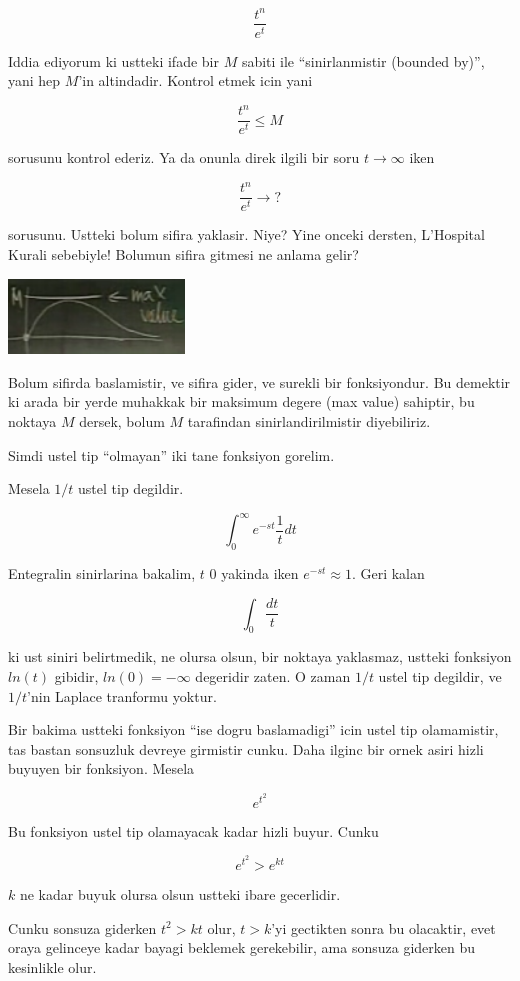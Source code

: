 \documentclass[12pt,fleqn]{article}
\begin{document}
\[ \frac{t^n}{e^t} \]

Iddia ediyorum ki ustteki ifade bir $M$ sabiti ile ``sinirlanmistir
(bounded by)'', yani hep $M$'in altindadir. Kontrol etmek icin yani

\[ \frac{t^n}{e^t} \le  M\]

sorusunu kontrol ederiz. Ya da onunla direk ilgili bir soru  $t \to \infty$ iken

\[ \frac{t^n}{e^t} \to ?\]

sorusunu. Ustteki bolum sifira yaklasir. Niye? Yine onceki dersten,
L'Hospital Kurali sebebiyle! Bolumun sifira gitmesi ne anlama gelir? 

\includegraphics[height=2cm]{20_1.png}

Bolum sifirda baslamistir, ve sifira gider, ve surekli bir fonksiyondur. Bu
demektir ki arada bir yerde muhakkak bir maksimum degere (max value)
sahiptir, bu noktaya $M$ dersek, bolum $M$ tarafindan sinirlandirilmistir
diyebiliriz.

Simdi ustel tip ``olmayan'' iki tane fonksiyon gorelim. 

Mesela $1/t$ ustel tip degildir. 

\[ \int_0^{\infty} e^{-st}\frac{1}{t} dt  \]

Entegralin sinirlarina bakalim, $t$ 0 yakinda iken $e^{-st} \approx
1$. Geri kalan

\[ \int_0 \frac{dt}{t} \]

ki ust siniri belirtmedik, ne olursa olsun, bir noktaya yaklasmaz, ustteki
fonksiyon $ln(t)$ gibidir, $ln(0)=-\infty$ degeridir zaten. O zaman $1/t$
ustel tip degildir, ve $1/t$'nin Laplace tranformu yoktur. 

Bir bakima ustteki fonksiyon ``ise dogru baslamadigi'' icin ustel tip
olamamistir, tas bastan sonsuzluk devreye girmistir cunku. Daha ilginc bir
ornek asiri hizli buyuyen bir fonksiyon. Mesela

\[ e^{t^2} \]

Bu fonksiyon ustel tip olamayacak kadar hizli buyur. Cunku 

\[ e^{t^2} > e^{kt} \]

$k$ ne kadar buyuk olursa olsun ustteki ibare gecerlidir. 

Cunku sonsuza giderken $t^2 > kt$ olur, $t>k$'yi gectikten sonra bu
olacaktir, evet oraya gelinceye kadar bayagi beklemek gerekebilir, ama
sonsuza giderken bu kesinlikle olur.
\end{document}
